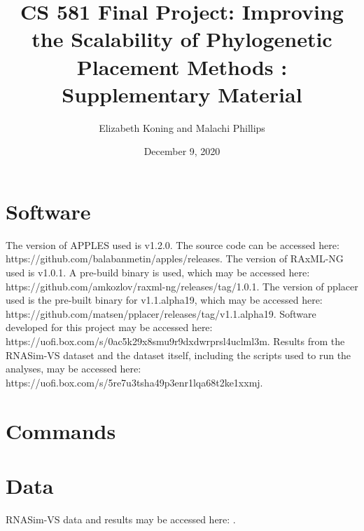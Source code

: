 \documentclass[10pt]{article}
\title{CS 581 Final Project: Improving the Scalability of Phylogenetic Placement Methods : Supplementary Material}
\author{Elizabeth Koning and Malachi Phillips}
\date{December 9, 2020}
\begin{document}
\maketitle

\section{Software}
The version of APPLES used is v1.2.0. The source code can be accessed here:\newline
https://github.com/balabanmetin/apples/releases.\newline
The version of RAxML-NG used is v1.0.1. A pre-build binary is used, which may be accessed here:\newline
https://github.com/amkozlov/raxml-ng/releases/tag/1.0.1.\newline
The version of pplacer used is the pre-built binary for v1.1.alpha19, which may be accessed here:\newline
https://github.com/matsen/pplacer/releases/tag/v1.1.alpha19.
Software developed for this project may be accessed here:\newline
https://uofi.box.com/s/0ac5k29x8smu9r9dxdwrprsl4uclml3m.
Results from the RNASim-VS dataset and the dataset itself, including
the scripts used to run the analyses, may be accessed here:\newline
https://uofi.box.com/s/5re7u3tsha49p3enr1lqa68t2ke1xxmj.

\section{Commands}
\section{Data}

RNASim-VS data and results may be accessed here: .
\end{document}
